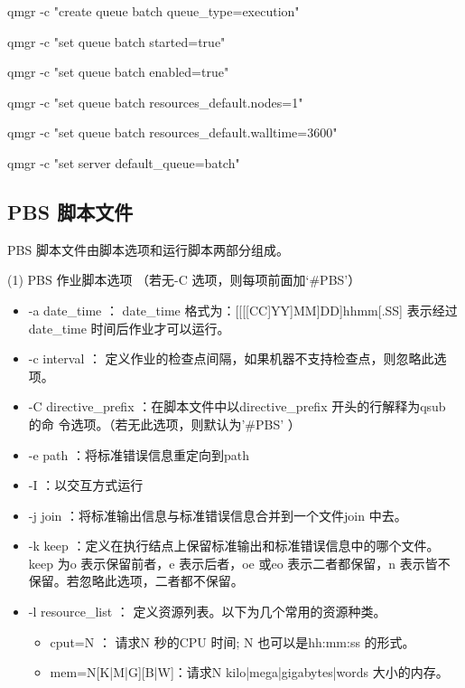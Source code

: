 {qmgr -c "create queue batch queue\_type=execution"

qmgr -c "set queue batch started=true"

qmgr -c "set queue batch enabled=true"

qmgr -c "set queue batch resources\_default.nodes=1"

qmgr -c "set queue batch resources\_default.walltime=3600"

qmgr -c "set server default\_queue=batch"



\subsection{PBS 脚本文件}
PBS 脚本文件由脚本选项和运行脚本两部分组成。

(1) PBS 作业脚本选项 （若无-C 选项，则每项前面加‘\#PBS’）
\begin{itemize}
\item -a date\_time ： date\_time 格式为：[[[[CC]YY]MM]DD]hhmm[.SS]
表示经过date\_time 时间后作业才可以运行。

\item -c interval ： 定义作业的检查点间隔，如果机器不支持检查点，则忽略此选项。

\item -C directive\_prefix ：在脚本文件中以directive\_prefix 开头的行解释为qsub 的命
令选项。（若无此选项，则默认为’\#PBS’ ）

\item -e path ：将标准错误信息重定向到path

\item -I ：以交互方式运行

\item -j join ：将标准输出信息与标准错误信息合并到一个文件join 中去。

\item  -k keep ：定义在执行结点上保留标准输出和标准错误信息中的哪个文件。
keep 为o 表示保留前者，e 表示后者，oe 或eo 表示二者都保留，n 表示皆不保留。若忽略此选项，二者都不保留。

\item -l resource\_list ： 定义资源列表。以下为几个常用的资源种类。
	\begin{itemize}
	\item  cput=N ： 请求N 秒的CPU 时间; N 也可以是hh:mm:ss 的形式。	
	
	\item mem=N[K|M|G][B|W]：请求N {kilo|mega|giga}{bytes|words} 大小的内存。
	

\end{itemize}
\end{itemize}}
